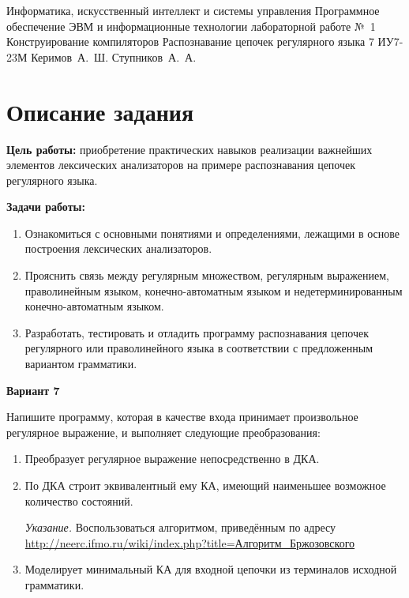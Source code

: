 \documentclass{bmstu-gost-7-32}
\begin{document}
\makereporttitle
	{Информатика, искусственный интеллект и системы управления} %
	{Программное обеспечение ЭВМ и информационные технологии} %
	{лабораторной работе №~1} %
	{Конструирование компиляторов} %
	{Распознавание цепочек регулярного языка} %
	{7} %
	{ИУ7-23М} %
	{Керимов~А.~Ш.} %
	{Ступников~А.~А.} %

\section*{Описание задания}

\textbf{Цель работы:} приобретение практических навыков реализации важнейших элементов лексических анализаторов на примере распознавания цепочек регулярного языка.

\textbf{Задачи работы:}
\begin{enumerate}
	\item Ознакомиться с основными понятиями и определениями, лежащими в основе построения лексических анализаторов. \\
	\item Прояснить связь между регулярным множеством, регулярным выражением, праволинейным языком, конечно-автоматным языком и недетерминированным конечно-автоматным языком.
	\item Разработать, тестировать и отладить программу распознавания цепочек регулярного или праволинейного языка в соответствии с предложенным вариантом грамматики.
\end{enumerate}

\textbf{Вариант 7}

Напишите программу, которая в качестве входа принимает произвольное регулярное выражение, и выполняет следующие преобразования:

\begin{enumerate}
	\item Преобразует регулярное выражение непосредственно в ДКА.
	\item По ДКА строит эквивалентный ему КА, имеющий наименьшее возможное количество состояний.

	\textit{Указание.} Воспользоваться алгоритмом, приведённым по адресу \href{http://neerc.ifmo.ru/wiki/index.php?title=%
		\%D0\%90\%D0\%BB\%D0\%B3\%D0\%BE\%D1\%80\%D0\%B8\%D1\%82\%D0\%BC_%
		\%D0\%91\%D1\%80\%D0\%B6\%D0\%BE\%D0\%B7\%D0\%BE\%D0\%B2\%D1\%81\%D0\%BA\%D0\%BE\%D0\%B3\%D0\%BE}%
	{http://neerc.ifmo.ru/wiki/index.php?title=Алгоритм\_Бржозовского}

	\item Моделирует минимальный КА для входной цепочки из терминалов исходной грамматики.
\end{enumerate}
\end{document}
